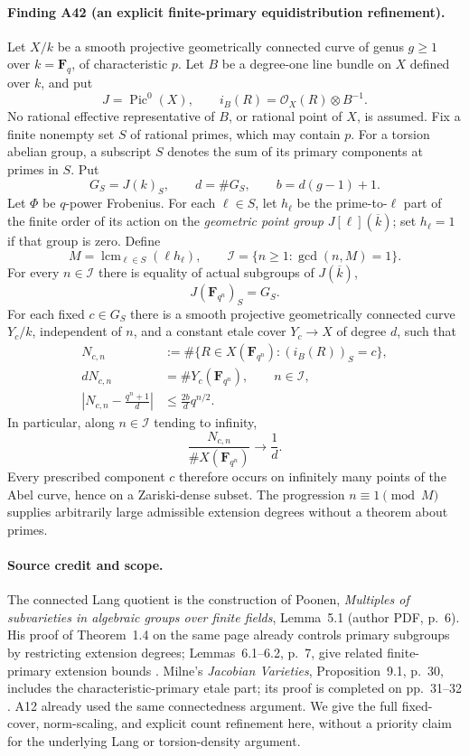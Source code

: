 \documentclass[11pt,a4paper]{article}
\begin{document}
\paragraph{Finding A42 (an explicit finite-primary equidistribution refinement).}
Let $X/k$ be a smooth projective geometrically connected curve of
genus $g\ge1$ over $k=\mathbf F_q$, of characteristic $p$.
Let $B$ be a degree-one line bundle on $X$ defined over $k$, and put
\[
 J=\operatorname{Pic}^0(X),\qquad
 i_B(R)=\mathcal O_X(R)\otimes B^{-1}.
 \tag{PE.1}
\]
No rational effective representative of $B$, or rational point of
$X$, is assumed. Fix a finite nonempty set $S$ of rational primes,
which may contain $p$. For a torsion abelian group, a subscript $S$
denotes the sum of its primary components at primes in $S$. Put
\[
 G_S=J(k)_S,\qquad d=\#G_S,\qquad b=d(g-1)+1.
 \tag{PE.2}
\]
Let $\Phi$ be $q$-power Frobenius. For each $\ell\in S$, let
$h_\ell$ be the prime-to-$\ell$ part of the finite order of its
action on the \emph{geometric point group}
$J[\ell](\overline k)$; set $h_\ell=1$ if that group is zero.
Define
\[
 M=\operatorname{lcm}_{\ell\in S}(\ell h_\ell),\qquad
 \mathcal I=\{n\ge1:\gcd(n,M)=1\}.
 \tag{PE.3}
\]
For every $n\in\mathcal I$ there is equality of actual subgroups
of $J(\overline k)$,
\[
                    J(\mathbf F_{q^n})_S=G_S.
 \tag{PE.4}
\]
For each fixed $c\in G_S$ there is a smooth projective
geometrically connected curve $Y_c/k$, independent of $n$, and a
constant etale cover $Y_c\to X$ of degree $d$, such that
\[
 \begin{aligned}
 N_{c,n}&:=\#\{R\in X(\mathbf F_{q^n}):(i_B(R))_S=c\},\\
 dN_{c,n}&=\#Y_c(\mathbf F_{q^n}),\qquad n\in\mathcal I,\\
 \left|N_{c,n}-\frac{q^n+1}{d}\right|
             &\le\frac{2b}{d}q^{n/2}.
 \end{aligned}
 \tag{PE.5}
\]
In particular, along $n\in\mathcal I$ tending to infinity,
\[
                \frac{N_{c,n}}{\#X(\mathbf F_{q^n})}
                           \longrightarrow\frac1d.
 \tag{PE.6}
\]
Every prescribed component $c$ therefore occurs on infinitely
many points of the Abel curve, hence on a Zariski-dense subset.
The progression $n\equiv1\pmod M$ supplies arbitrarily large
admissible extension degrees without a theorem about primes.

\paragraph{Source credit and scope.}
The connected Lang quotient is the construction of Poonen,
\emph{Multiples of subvarieties in algebraic groups over finite
fields}, Lemma~5.1 (author PDF, p.~6). His proof of Theorem~1.4 on
the same page already controls primary subgroups by restricting
extension degrees; Lemmas~6.1--6.2, p.~7, give related finite-primary
extension bounds \cite{Poonen2005}. Milne's
\emph{Jacobian Varieties}, Proposition~9.1, p.~30, includes the
characteristic-primary etale part; its proof is completed on
pp.~31--32 \cite{MilneJV}. A12 already used the same connectedness
argument. We give the full fixed-cover, norm-scaling, and explicit
count refinement here, without a priority claim for the underlying
Lang or torsion-density argument.
\end{document}
